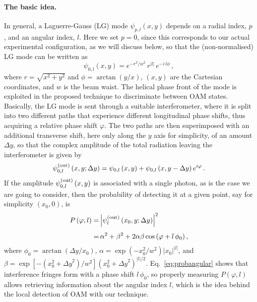 \documentclass[
reprint,
amsmath,amssymb,
aps,
showkeys
]{revtex4-2}
\begin{document}
\paragraph*{\label{sec:idea} The basic idea.}
In general, a Laguerre-Gauss (LG) mode $\psi_{p,l}(x,y)$ depends on a radial index, $p$, and an angular index, $l$.
Here we set $p=0$, since this corresponds to our actual experimental configuration, as we will discuss below, so that the (non-normalised) LG mode can be written as
%
\begin{equation}
\psi_{0,l}(x,y) = e^{-r^2/w^2} \, r^{\left|l\right|}\, e^{-i \, l \phi} \, ,
\end{equation}
%
where $r = \sqrt{x^2+y^2}$ and $\phi = \arctan (y/x)$, $(x,y)$ are the Cartesian coordinates, and $w$ is the beam waist.
The helical phase front of the mode is exploited in the proposed technique to discriminate between OAM states.
Basically, the LG mode is sent through a suitable interferometer, where it is split into two different paths that experience different longitudinal phase shifts, thus acquiring a relative phase shift $\varphi$.
The two paths are then superimposed with an additional transverse shift, here only along the $y$ axis for simplicity, of an amount $\Delta y$, so that the complex amplitude of the total radiation leaving the interferometer is given by
%
\begin{equation}
\psi_{0,l}^{\rm (out)}\left(x,y;\Delta y\right) = \psi_{0,l}\left(x,y\right) + \psi_{0,l}\left(x,y-\Delta y\right) e^{i \varphi} \, .
\end{equation}
%
If the amplitude $\psi_{0,l}^{\rm (out)}\left(x,y\right)$ is associated with a single photon, as is the case we are going to consider, then the probability of detecting it at a given point, say for simplicity $\left(x_0,0\right)$, is
%
\begin{align}\label{eq:probangular}
    P\left(\varphi,l\right) =&
    \left|\psi_{l}^{\rm (out)}\left(x_0,y;\Delta y\right)\right|^2
    \nonumber \\[1ex]
    =&
    \,\alpha^2 + \beta^2 + 2\alpha\beta\cos{\left(\varphi + l\,\phi_0\right)}
    \, ,
\end{align}
%
where $\phi_0 = \arctan{\left(\Delta y/x_0\right)}$, $\alpha = \exp{(-x_0^2 / w^2)}\left|x_0\right|^{\left|l\right|}$, and $\beta = \exp{\left[-\left(x_0^2 + {\Delta y}^2\right) / w^2\right]\left({x_0^2 + {\Delta y}^2}\right)^{\left|l\right|/2}}$.
Eq.~\ref{eq:probangular} shows that interference fringes form with a phase shift $l \, \phi_0$, so properly measuring $P\left(\varphi,l\right)$ allows retrieving information about the angular index $l$, which is the idea behind the local detection of OAM with our technique.
\end{document}
